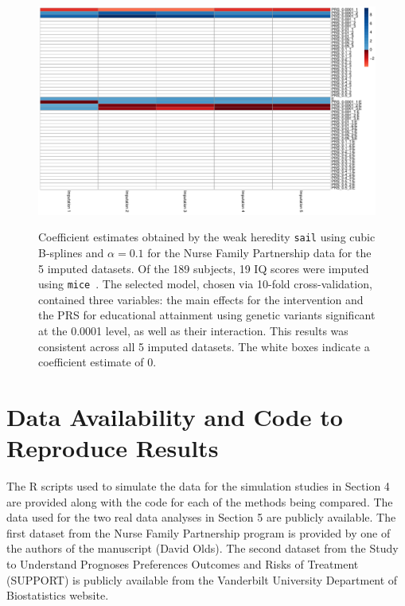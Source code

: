\documentclass[a4paper,fleqn]{cas-sc}
\begin{document}
	

\begin{figure}[h]
		
		{\centering \includegraphics[width=1\linewidth]{figure/PRS-model-selection-1} 
		}
		
		\caption{Coefficient estimates obtained by the weak heredity \texttt{sail} using cubic B-splines and $\alpha=0.1$ for the Nurse Family Partnership data for the 5 imputed datasets. Of the 189 subjects, 19 IQ scores were imputed using \texttt{mice}~\citep{buuren2010mice}. The selected model, chosen via 10-fold cross-validation, contained three variables: the main effects for the intervention and the PRS for educational attainment using genetic variants significant at the 0.0001 level, as well as their interaction. This results was consistent across all 5 imputed datasets. The white boxes indicate a coefficient estimate of 0.}\label{fig:PRS-model-selection}
	\end{figure}
	

\FloatBarrier


\section{Data Availability and Code to Reproduce Results} \label{ap:rep}

The R scripts used to simulate the data for the simulation studies in Section 4 are provided along with the code for each of the methods being compared. The data used for the two real data analyses in Section 5 are publicly available. The first dataset from the Nurse Family Partnership program is provided by one of the authors of the manuscript (David Olds). The second dataset from the Study to Understand Prognoses Preferences Outcomes and Risks of Treatment (SUPPORT) is publicly available from the Vanderbilt University Department of Biostatistics website. 
\end{document}
